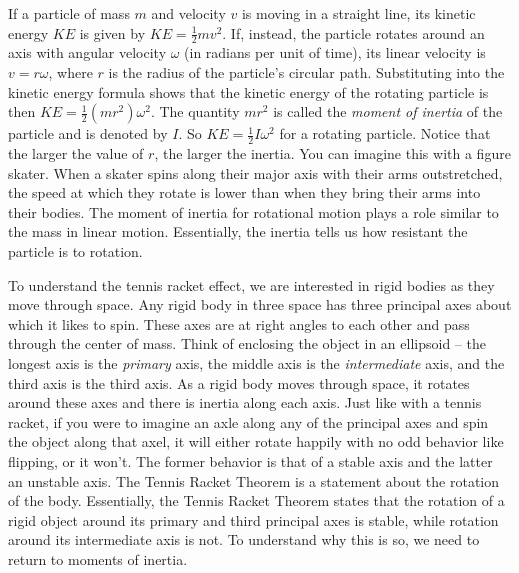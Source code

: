 	 \ea
	 
\ee


If a particle of mass $m$ and velocity $v$ is moving in a straight line, its kinetic energy $KE$ is given by $KE = \frac{1}{2}mv^2$. If, instead, the particle rotates around an axis with angular velocity $\omega$ (in radians per unit of time), its linear velocity is $v = r \omega$, where $r$ is the radius of the particle's circular path. Substituting into the kinetic energy formula shows that the kinetic energy of the rotating particle is then $KE = \frac{1}{2}\left(mr^2\right) \omega^2$. The quantity $mr^2$ is called the \emph{moment of inertia} of the particle and is denoted by $I$. So $KE = \frac{1}{2}I\omega^2$ for a rotating particle. Notice that the larger the value of $r$, the larger the inertia. You can imagine this with a figure skater. When a skater spins along their major axis with their arms outstretched, the speed at which they rotate is lower than when they bring their arms into their bodies. The moment of inertia for rotational motion plays a role similar to the mass in linear motion. Essentially, the inertia tells us how resistant the particle is to rotation. 

To understand the tennis racket effect, we are interested in rigid bodies as they move through space. Any rigid body in three space has three principal axes about which it likes to spin. These axes are at right angles to each other and pass through the center of mass. Think of enclosing the object in an ellipsoid -- the longest axis is the \emph{primary} axis, the middle axis is the \emph{intermediate} axis, and the third axis is the third axis. As a rigid body moves through space, it rotates around these axes and there is inertia along each axis. Just like with a tennis racket, if you were to imagine an axle along any of the principal axes and spin the object along that axel, it will either rotate happily with no odd behavior like flipping, or it won't. The former behavior is that of a stable axis and the latter an unstable axis. The Tennis Racket Theorem is a statement about the rotation of the body. Essentially, the Tennis Racket Theorem states that the rotation of a rigid object around its primary and third principal axes is stable, while rotation around its intermediate axis is not. To understand why this is so, we need to return to moments of inertia. 

